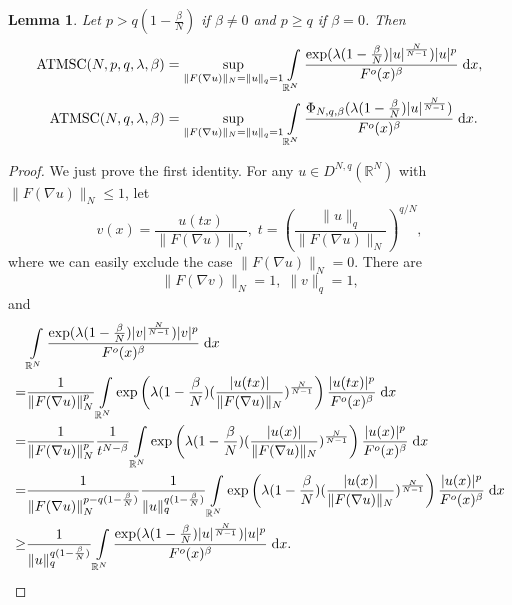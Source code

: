 \documentclass[11pt]{article}
\theoremstyle{plain}
\newtheorem{lemma}[theorem]{Lemma}
\numberwithin{equation}{section}
\newcommand{\R}{\mathbb{R}}
\begin{document}
\begin{lemma}\label{le2.5}
Let $p>q(1-\frac{\beta}{N})$ if $\beta\neq0$ and $p\geq q$ if $\beta=0$. Then
\begin{align}
    \mathrm{ATMSC}(N,p,q,\lambda,\beta)&=\sup\limits_{\|F(\nabla u)\|_{N}=\|u\|_{q}=1}\int\limits_{\R^{N}}\frac{\exp(\lambda(1-\frac{\beta}{N})\lvert u\rvert^{\frac{N}{N-1}})\lvert u\rvert^{p}}{F^{o}(x)^{\beta}}\;\mathrm{d}x,\notag\\
    \mathrm{ATMSC}(N,q,\lambda,\beta)&=\sup\limits_{\|F(\nabla u)\|_{N}=\|u\|_{q}=1}\int\limits_{\R^{N}}\frac{\Phi_{N,q,\beta}(\lambda(1-\frac{\beta}{N})\lvert u\rvert^{\frac{N}{N-1}})}{F^{o}(x)^{\beta}}\;\mathrm{d}x.\notag
\end{align}
\end{lemma}
\begin{proof}
We just prove the first identity. For any $u\in D^{N,q}(\R^{N})$ with $\|F(\nabla u)\|_{N}\leq1$, let
$$
v(x)=\frac{u(tx)}{\|F(\nabla u)\|_{N}},\;t=\left(\frac{\|u\|_{q}}{\|F(\nabla u)\|_{N}}\right)^{q/N},
$$
where we can easily exclude the case $\|F(\nabla u)\|_{N}=0$. There are
$$
\|F(\nabla v)\|_{N}=1,\;\|v\|_{q}=1,
$$
and
\begin{align}
    &\int\limits_{\R^{N}}\frac{\exp(\lambda(1-\frac{\beta}{N})\lvert v\rvert^{\frac{N}{N-1}})\lvert v\rvert^{p}}{F^{o}(x)^{\beta}}\;\mathrm{d}x\notag\\
    =&\frac{1}{\|F(\nabla u)\|_{N}^{p}}\int\limits_{\R^{N}}\exp\left(\lambda(1-\frac{\beta}{N})(\frac{\lvert u(tx)\rvert}{\|F(\nabla u)\|_{N}})^{\frac{N}{N-1}}\right)\frac{\lvert u(tx)\rvert^{p}}{F^{o}(x)^{\beta}}\;\mathrm{d}x\notag\\
    =&\frac{1}{\|F(\nabla u)\|_{N}^{p}}\frac{1}{t^{N-\beta}}\int\limits_{\R^{N}}\exp\left(\lambda(1-\frac{\beta}{N})(\frac{\lvert u(x)\rvert}{\|F(\nabla u)\|_{N}})^{\frac{N}{N-1}}\right)\frac{\lvert u(x)\rvert^{p}}{F^{o}(x)^{\beta}}\;\mathrm{d}x\notag\\
    =&\frac{1}{\|F(\nabla u)\|_{N}^{p-q(1-\frac{\beta}{N})}}\frac{1}{\|u\|_{q}^{q(1-\frac{\beta}{N})}}\int\limits_{\R^{N}}\exp\left(\lambda(1-\frac{\beta}{N})(\frac{\lvert u(x)\rvert}{\|F(\nabla u)\|_{N}})^{\frac{N}{N-1}}\right)\frac{\lvert u(x)\rvert^{p}}{F^{o}(x)^{\beta}}\;\mathrm{d}x\notag\\
    \geq&\frac{1}{\|u\|_{q}^{q(1-\frac{\beta}{N})}}\int\limits_{\R^{N}}\frac{\exp(\lambda(1-\frac{\beta}{N})\lvert u\rvert^{\frac{N}{N-1}})\lvert u\rvert^{p}}{F^{o}(x)^{\beta}}\;\mathrm{d}x.\notag
\end{align}
\end{proof}
\end{document}
